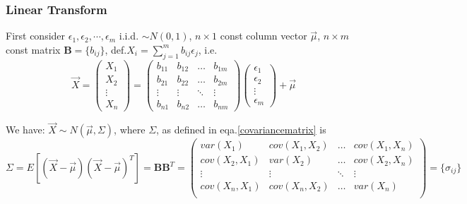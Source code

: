 \subsubsection{Linear Transform}
    First consider $\epsilon_1,\epsilon_2,\cdots,\epsilon_m$ i.i.d. $\sim N(0,1)$, $n\times 1$ const column vector $\vec{\mu}$, $n\times m$ const matrix $\mathbf{B}=\{b_{ij}\}$, def.$X_i={\displaystyle\sum_{j=1}^m b_{ij}\epsilon_j}$, i.e.
    \begin{equation}
        \vec{X}=
        \begin{pmatrix}
            X_1\\X_2\\ \vdots\\X_n
        \end{pmatrix}
        =
        \begin{pmatrix}
            b_{11}&b_{12}&\ldots&b_{1m}\\
            b_{21}&b_{22}&\ldots&b_{2m}\\
            \vdots&\vdots&\ddots&\vdots\\
            b_{n1}&b_{n2}&\ldots&b_{nm}
        \end{pmatrix}
        \begin{pmatrix}
            \epsilon_1\\
            \epsilon_2\\
            \vdots\\
            \epsilon_m
        \end{pmatrix}
        +\vec{\mu}
    \end{equation}

    
    We have: $\vec{X}\sim N(\vec{\mu},\Sigma)$, where $\Sigma$, as defined in eqa.\ref{covariancematrix} is
    \begin{equation}
        \Sigma=E[(\vec{X}-\vec{\mu})(\vec{X}-\vec{\mu})^T]=\mathbf{BB}^T=
        \begin{pmatrix}
        var(X_1) & cov(X_1,X_2) & \ldots & cov(X_1,X_n)\\
        cov(X_2,X_1) & var(X_2) & \ldots & cov(X_2,X_n)\\
        \vdots & \vdots & \ddots & \vdots\\
        cov(X_n,X_1) & cov(X_n,X_2) & \ldots & var(X_n)\\
        \end{pmatrix}  
        =\{\sigma_{ij}\}  
    \end{equation}

